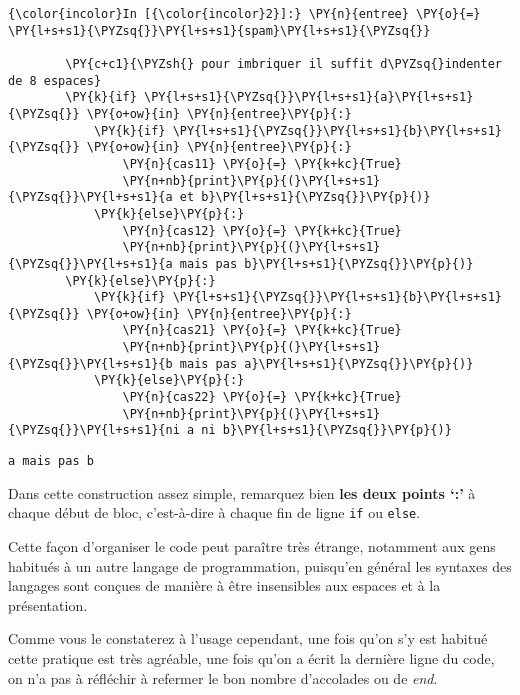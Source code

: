     \begin{Verbatim}[commandchars=\\\{\},frame=single,framerule=0.3mm,rulecolor=\color{cellframecolor}]
{\color{incolor}In [{\color{incolor}2}]:} \PY{n}{entree} \PY{o}{=} \PY{l+s+s1}{\PYZsq{}}\PY{l+s+s1}{spam}\PY{l+s+s1}{\PYZsq{}}
        
        \PY{c+c1}{\PYZsh{} pour imbriquer il suffit d\PYZsq{}indenter de 8 espaces}
        \PY{k}{if} \PY{l+s+s1}{\PYZsq{}}\PY{l+s+s1}{a}\PY{l+s+s1}{\PYZsq{}} \PY{o+ow}{in} \PY{n}{entree}\PY{p}{:}
            \PY{k}{if} \PY{l+s+s1}{\PYZsq{}}\PY{l+s+s1}{b}\PY{l+s+s1}{\PYZsq{}} \PY{o+ow}{in} \PY{n}{entree}\PY{p}{:}
                \PY{n}{cas11} \PY{o}{=} \PY{k+kc}{True}
                \PY{n+nb}{print}\PY{p}{(}\PY{l+s+s1}{\PYZsq{}}\PY{l+s+s1}{a et b}\PY{l+s+s1}{\PYZsq{}}\PY{p}{)}
            \PY{k}{else}\PY{p}{:}
                \PY{n}{cas12} \PY{o}{=} \PY{k+kc}{True}
                \PY{n+nb}{print}\PY{p}{(}\PY{l+s+s1}{\PYZsq{}}\PY{l+s+s1}{a mais pas b}\PY{l+s+s1}{\PYZsq{}}\PY{p}{)}
        \PY{k}{else}\PY{p}{:}
            \PY{k}{if} \PY{l+s+s1}{\PYZsq{}}\PY{l+s+s1}{b}\PY{l+s+s1}{\PYZsq{}} \PY{o+ow}{in} \PY{n}{entree}\PY{p}{:}
                \PY{n}{cas21} \PY{o}{=} \PY{k+kc}{True}
                \PY{n+nb}{print}\PY{p}{(}\PY{l+s+s1}{\PYZsq{}}\PY{l+s+s1}{b mais pas a}\PY{l+s+s1}{\PYZsq{}}\PY{p}{)}
            \PY{k}{else}\PY{p}{:}
                \PY{n}{cas22} \PY{o}{=} \PY{k+kc}{True}
                \PY{n+nb}{print}\PY{p}{(}\PY{l+s+s1}{\PYZsq{}}\PY{l+s+s1}{ni a ni b}\PY{l+s+s1}{\PYZsq{}}\PY{p}{)}
\end{Verbatim}


    \begin{Verbatim}[commandchars=\\\{\},frame=single,framerule=0.3mm,rulecolor=\color{cellframecolor}]
a mais pas b
\end{Verbatim}

    Dans cette construction assez simple, remarquez bien \textbf{les deux
points `:'} à chaque début de bloc, c'est-à-dire à chaque fin de ligne
\texttt{if} ou \texttt{else}.

    Cette façon d'organiser le code peut paraître très étrange, notamment
aux gens habitués à un autre langage de programmation, puisqu'en général
les syntaxes des langages sont conçues de manière à être insensibles aux
espaces et à la présentation.

Comme vous le constaterez à l'usage cependant, une fois qu'on s'y est
habitué cette pratique est très agréable, une fois qu'on a écrit la
dernière ligne du code, on n'a pas à réfléchir à refermer le bon nombre
d'accolades ou de \emph{end}.

